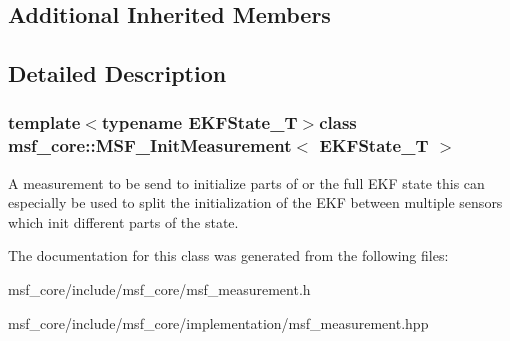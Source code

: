 \subsection*{Additional Inherited Members}


\subsection{Detailed Description}
\subsubsection*{template$<$typename E\-K\-F\-State\-\_\-\-T$>$class msf\-\_\-core\-::\-M\-S\-F\-\_\-\-Init\-Measurement$<$ E\-K\-F\-State\-\_\-\-T $>$}

A measurement to be send to initialize parts of or the full E\-K\-F state this can especially be used to split the initialization of the E\-K\-F between multiple sensors which init different parts of the state. 

The documentation for this class was generated from the following files\-:\begin{DoxyCompactItemize}
\item 
msf\-\_\-core/include/msf\-\_\-core/msf\-\_\-measurement.\-h\item 
msf\-\_\-core/include/msf\-\_\-core/implementation/msf\-\_\-measurement.\-hpp\end{DoxyCompactItemize}
